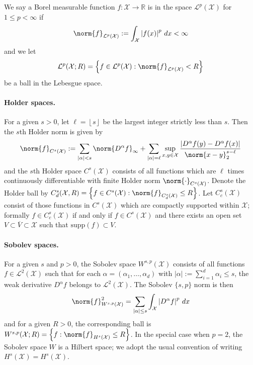 \documentclass{article}
\newcommand{\Reals}{\mathbb{R}}
\newcommand{\abs}[1]{\left \lvert #1 \right \rvert}
\newcommand{\set}[1]{\left\{#1\right\}}
\newcommand{\floor}[1]{\left\lfloor #1 \right\rfloor}
\newcommand{\1}{\mathbf{1}}
\newcommand{\Xset}{\mathcal{X}}
\newcommand{\Leb}{\mathcal{L}}
\newcommand{\ol}[1]{\overline{#1}}
\theoremstyle{alden}
\theoremstyle{aldenthm}
\theoremstyle{definition}
\theoremstyle{remark}
\begin{document}
We say a Borel measurable function $f: \mathcal{X} \to \Reals$ is in the space $\mathcal{L}^p(\mathcal{X})$ for $1 \leq p < \infty$ if 
$$\norm{f}_{\mathcal{L}^p(\mathcal{X})} := \int_{\mathcal{X}} \abs{f(x)}^p \,dx < \infty$$
and we let 
\begin{equation*}
\mathcal{L}^p(\mathcal{X};R) = \set{f \in \mathcal{L}^p(\mathcal{X}): \norm{f}_{\mathcal{L}^p(\mathcal{X})} < R}
\end{equation*}
be a ball in the Lebesgue space.


\paragraph{Holder spaces.}

For a given $s > 0$, let $\ell = \floor{s}$ be the largest integer strictly less than $s$. Then the $s$th Holder norm is given by
\begin{equation*}
\norm{f}_{C^{s}(\mathcal{X})} := \sum_{\abs{\alpha} < s} \norm{D^{\alpha}f}_{\infty} + \sum_{\abs{\alpha} = \ell} \sup_{x,y \in \mathcal{X}} \frac{\abs{D^{\alpha}f(y) - D^{\alpha}f(x)}}{\norm{x - y}_2^{s - \ell}}
\end{equation*}
and the $s$th Holder space $C^{s}(\mathcal{X})$ consists of all functions which are $\ell$ times continuously differentiable with finite Holder norm $\norm{\cdot}_{C^{s}(\mathcal{X})}$. Denote the Holder ball by $C_d^{s}(\mathcal{X},R) = \set{f \in C^{s}(\mathcal{X}): \norm{f}_{C_d^{s}(\mathcal{X})} \leq R}$. Let $C_c^{s}(\Xset)$ consist of those functions in $C^s(\Xset)$ which are compactly supported within $\Xset$; formally $f \in C_c^{s}(\Xset)$ if and only if $f \in C^s(\Xset)$ and there exists an open set $V \subset \ol{V} \subset \Xset$ such that $\mathrm{supp}(f) \subset V$. 

\paragraph{Sobolev spaces.}

For a given $s$ and $p > 0$, the Sobolev space $W^{s,p}(\mathcal{X})$ consists of all functions $f \in \Leb^2(\mathcal{X})$ such that for each $\alpha = (\alpha_1,\ldots,\alpha_d)$ with $\abs{\alpha} := \sum_{i = 1}^{d} \alpha_i \leq s$, the weak derivative $D^{\alpha}f$ belongs to $\mathcal{L}^2(\mathcal{X})$. The Sobolev $\{s,p\}$ norm is then 
\begin{equation*}
\norm{f}_{W^{s,p}(\mathcal{X})}^2 = \sum_{\abs{\alpha} \leq s} \int_{\mathcal{X}} \abs{D^{\alpha}f}^p \,dx
\end{equation*}
and for a given $R > 0$, the corresponding ball is $W^{s,p}(\Xset; R) = \set{f: \norm{f}_{H^s(\Xset)} \leq R}$. In the special case when $p = 2$, the Sobolev space $W$ is a Hilbert space; we adopt the usual convention of writing $H^s(\Xset) = H^s(\Xset)$. 
\end{document}
